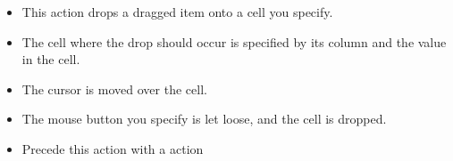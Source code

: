 
\begin{itemize}
\item This action drops a dragged item onto a cell you specify.
\item The cell where the drop should occur is specified by its column and the value in the cell.
\item The cursor is moved over the cell.
\item The mouse button you specify is let loose, and the cell is dropped. 
\item Precede this action with a  action
\end{itemize}

